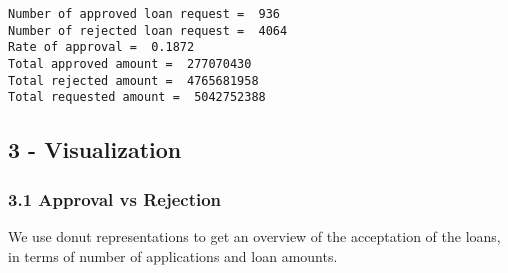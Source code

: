 \documentclass[11pt]{article}
\begin{document}
    \begin{Verbatim}[commandchars=\\\{\}]
Number of approved loan request =  936
Number of rejected loan request =  4064
Rate of approval =  0.1872
Total approved amount =  277070430
Total rejected amount =  4765681958
Total requested amount =  5042752388
    \end{Verbatim}

    \hypertarget{visualization}{%
\subsection{3 - Visualization}\label{visualization}}

\hypertarget{approval-vs-rejection}{%
\subsubsection{3.1 Approval vs Rejection}\label{approval-vs-rejection}}

We use donut representations to get an overview of the acceptation of
the loans, in terms of number of applications and loan amounts.
\end{document}
